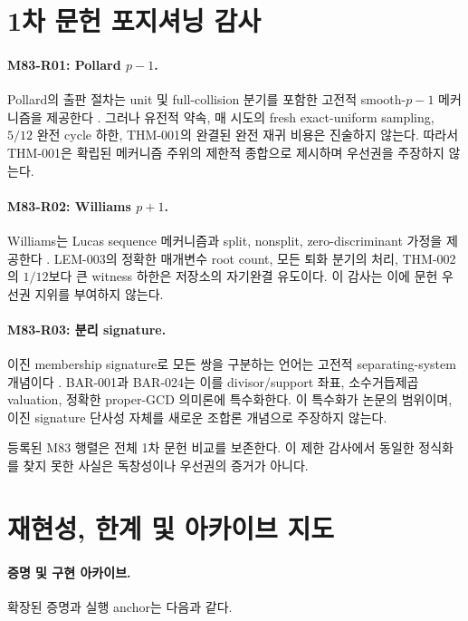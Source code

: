 \documentclass[11pt]{article}
\begin{document}
\appendix

\section{1차 문헌 포지셔닝 감사}
\label{app:promise-source-positioning}

\paragraph{M83-R01: Pollard \(p-1\).}
Pollard의 출판 절차는 unit 및 full-collision 분기를 포함한 고전적
smooth-\(p-1\) 메커니즘을 제공한다 \cite{pollard1974theorems}. 그러나
유전적 약속, 매 시도의 fresh exact-uniform sampling, \(5/12\) 완전
cycle 하한, THM-001의 완결된 완전 재귀 비용은 진술하지 않는다.
따라서 THM-001은 확립된 메커니즘 주위의 제한적 종합으로 제시하며
우선권을 주장하지 않는다.

\paragraph{M83-R02: Williams \(p+1\).}
Williams는 Lucas sequence 메커니즘과 split, nonsplit,
zero-discriminant 가정을 제공한다 \cite{williams1982pplusone}.
LEM-003의 정확한 매개변수 root count, 모든 퇴화 분기의 처리,
THM-002의 \(1/12\)보다 큰 witness 하한은 저장소의 자기완결
유도이다. 이 감사는 이에 문헌 우선권 지위를 부여하지 않는다.

\paragraph{M83-R03: 분리 signature.}
이진 membership signature로 모든 쌍을 구분하는 언어는 고전적
separating-system 개념이다 \cite{katona1966separating}. BAR-001과
BAR-024는 이를 divisor/support 좌표, 소수거듭제곱 valuation, 정확한
proper-GCD 의미론에 특수화한다. 이 특수화가 논문의 범위이며, 이진
signature 단사성 자체를 새로운 조합론 개념으로 주장하지 않는다.

등록된 M83 행렬은 전체 1차 문헌 비교를 보존한다. 이 제한 감사에서
동일한 정식화를 찾지 못한 사실은 독창성이나 우선권의 증거가 아니다.

\section{재현성, 한계 및 아카이브 지도}
\label{app:promise-reproduction}

\paragraph{증명 및 구현 아카이브.}
확장된 증명과 실행 anchor는 다음과 같다.
\par\smallskip
\noindent\begin{minipage}{\linewidth}
\raggedright\small
{}\\
\\
\\
\end{minipage}
\end{document}
